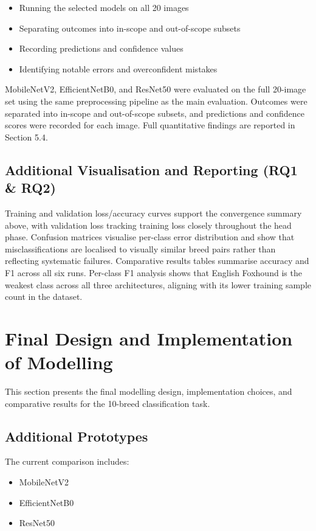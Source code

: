 \documentclass[12pt, a4paper]{article}
\begin{document}
\begin{itemize}
  \item Running the selected models on all 20 images
  \item Separating outcomes into in-scope and out-of-scope subsets
  \item Recording predictions and confidence values
  \item Identifying notable errors and overconfident mistakes
\end{itemize}

MobileNetV2, EfficientNetB0, and ResNet50 were evaluated on the full 20-image set using the same preprocessing pipeline as the main evaluation. Outcomes were separated into in-scope and out-of-scope subsets, and predictions and confidence scores were recorded for each image. Full quantitative findings are reported in Section 5.4.

\subsection{Additional Visualisation and Reporting (RQ1 \& RQ2)}

Training and validation loss/accuracy curves support the convergence summary above, with validation loss tracking training loss closely throughout the head phase. Confusion matrices visualise per-class error distribution and show that misclassifications are localised to visually similar breed pairs rather than reflecting systematic failures. Comparative results tables summarise accuracy and F1 across all six runs. Per-class F1 analysis shows that English Foxhound is the weakest class across all three architectures, aligning with its lower training sample count in the dataset.

\section{Final Design and Implementation of Modelling}

This section presents the final modelling design, implementation choices, and comparative results for the 10-breed classification task.

\subsection{Additional Prototypes}

The current comparison includes:

\begin{itemize}
  \item MobileNetV2
  \item EfficientNetB0
  \item ResNet50
\end{itemize}
\end{document}

